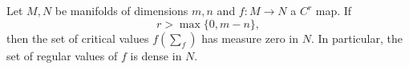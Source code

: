 Let $M, N$ be manifolds of dimensions $m, n$ and $f: M \to N$ a $C^r$ map. If
$$r > \max\{0, m - n\},$$
then the set of critical values $f(\sum_f)$ has measure zero in $N$. In particular, the set of regular values of $f$ is dense in $N$.
